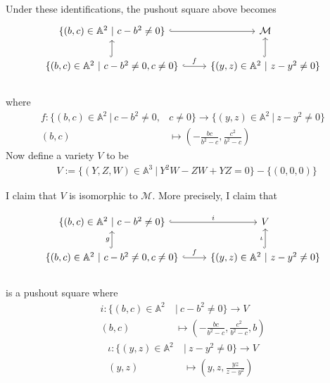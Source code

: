 \begin{example}
Under these identifications, the pushout square above becomes
\begin{displaymath}
\begin{tikzcd}
	\{
	(b,c)\in \mathbb{A}^2~|~
	c-b^2\neq 0 	
	\}
  \arrow[hookrightarrow]{r} & \mathcal{M} \\
	\{
	(b,c)\in \mathbb{A}^2~|~
	c-b^2\neq 0,c\neq 0 	
	\} 
  \arrow[hookrightarrow]{u} \arrow[hookrightarrow]{r}{f} 
  & \{
	(y,z)\in \mathbb{A}^2~|~
	z-y^2\neq 0 	
	\} 
  \arrow[hookrightarrow]{u} 
\end{tikzcd} 
\end{displaymath}\\
where
\begin{align*}
	f:\{(b,c)\in \mathbb{A}^2~|~c-b^2\neq 0,& c \neq 0\} 				\rightarrow 
	\{(y,z)\in \mathbb{A}^2~|~z-y^2\neq 0 \} \\
	(b,c)&\mapsto (-\frac{bc}{b^2-c},\frac{c^2}{b^2-c})
\end{align*}
Now define a variety $V$ to be 
\begin{align*}
	&V:=\{(Y,Z,W)\in \mathbb{A}^3 ~|~ Y^2W-ZW+YZ=0\}-\{(0,0,0)\}
\end{align*}

I claim that $V$ is isomorphic to $\mathcal{M}$. More precisely, I claim that 

\begin{displaymath}
\begin{tikzcd}
	\{
	(b,c)\in \mathbb{A}^2~|~
	c-b^2\neq 0 	
	\}
  \arrow[hookrightarrow]{r}{i} & V \\
	\{
	(b,c)\in \mathbb{A}^2~|~
	c-b^2\neq 0,c\neq 0 	
	\} 
  \arrow[hookrightarrow]{u}{g} \arrow[hookrightarrow]{r}{f} 
  & \{
	(y,z)\in \mathbb{A}^2~|~
	z-y^2\neq 0 	
	\} 
  \arrow[hookrightarrow]{u}{\iota}
\end{tikzcd} 
\end{displaymath}\\
is a pushout square where
\begin{align*}
	i:\{(b,c)\in \mathbb{A}^2~&|~c-b^2\neq 0\} 							\rightarrow 
	V \\
	(b,c)&\mapsto (-\frac{bc}{b^2-c},\frac{c^2}{b^2-c},b)
\end{align*}
\begin{align*}
	\iota:\{(y,z)\in \mathbb{A}^2~&|~z-y^2\neq 0 \} 						\rightarrow 
	V \\
	(y,z)&\mapsto (y,z,\frac{yz}{z-y^2})
\end{align*}


\end{example}
